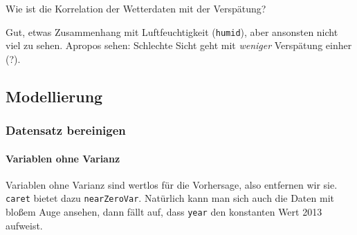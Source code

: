 \documentclass[]{article}
\newenvironment{Shaded}{\begin{snugshade}}{\end{snugshade}}
\newcommand{\CommentTok}[1]{\textcolor[rgb]{0.56,0.35,0.01}{\textit{#1}}}
\newcommand{\KeywordTok}[1]{\textcolor[rgb]{0.13,0.29,0.53}{\textbf{#1}}}
\newcommand{\NormalTok}[1]{#1}
\newcommand{\OperatorTok}[1]{\textcolor[rgb]{0.81,0.36,0.00}{\textbf{#1}}}
\newcommand{\StringTok}[1]{\textcolor[rgb]{0.31,0.60,0.02}{#1}}
\let\oldparagraph\paragraph
\renewcommand{\paragraph}[1]{\oldparagraph{#1}\mbox{}}
\begin{document}
Wie ist die Korrelation der Wetterdaten mit der Verspätung?

\begin{Shaded}
\end{Shaded}

Gut, etwas Zusammenhang mit Luftfeuchtigkeit (\texttt{humid}), aber
ansonsten nicht viel zu sehen. Apropos sehen: Schlechte Sicht geht mit
\emph{weniger} Verspätung einher (?).

\hypertarget{modellierung}{%
\subsection{Modellierung}\label{modellierung}}

\hypertarget{datensatz-bereinigen}{%
\subsubsection{Datensatz bereinigen}\label{datensatz-bereinigen}}

\hypertarget{variablen-ohne-varianz}{%
\paragraph{Variablen ohne Varianz}\label{variablen-ohne-varianz}}

Variablen ohne Varianz sind wertlos für die Vorhersage, also entfernen
wir sie. \texttt{caret} bietet dazu \texttt{nearZeroVar}. Natürlich kann
man sich auch die Daten mit bloßem Auge ansehen, dann fällt auf, dass
\texttt{year} den konstanten Wert 2013 aufweist.

\begin{Shaded}
\end{Shaded}
\end{document}
